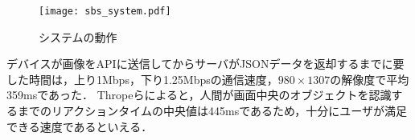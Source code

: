   \begin{figure}[tb]
    \centerline{\texttt{[image: sbs\_system.pdf]}}
    \caption{システムの動作}
    \label{figure:sbs_system}
  \end{figure}

  デバイスが画像をAPIに送信してからサーバがJSONデータを返却するまでに要した時間は，上り1Mbps，下り1.25Mbpsの通信速度，$980 \times 1307$の解像度で平均359msであった．
  Thropeらによると，人間が画面中央のオブジェクトを認識するまでのリアクションタイムの中央値は445msであるため\cite{Thorpe:1996}，十分にユーザが満足できる速度であるといえる．
